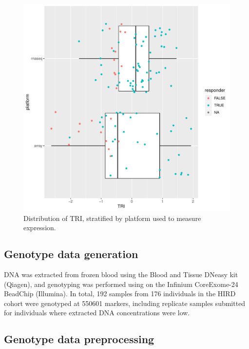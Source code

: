 

\begin{figure}
    \includegraphics[width=1.0\textwidth,page=1]{mainmatter/figures/chapter_02/compare_phenotype_by_platform.pheno_boxplots.pdf}
    \caption{Distribution of \gls{TRI}, stratified by platform used to measure expression.}
    \label{fig:hird_phenotypes_by_platform}
\end{figure}

\subsection{Genotype data generation}

DNA was extracted from frozen blood using the Blood and Tissue DNeasy kit (Qiagen), and genotyping was performed using on the Infinium CoreExome-24 BeadChip (Illumina).
In total, 192 samples from 176 individuals in the HIRD cohort were genotyped at 550601 markers, including replicate samples submitted for individuals where extracted DNA concentrations were low.

\subsection{Genotype data preprocessing}
\label{subsec:hird_dge_genotype_preproc}

